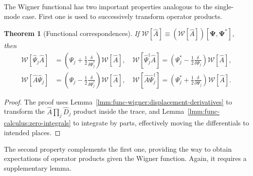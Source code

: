 \documentclass[12pt,aip,jmp,amssymb,amsmath]{revtex4-1}
\newtheorem{theorem}{Theorem}
\begin{document}
The Wigner functional has two important properties analogous to the single-mode case.
First one is used to successively transform operator products.

\begin{theorem}[Functional correspondences]
\label{thm:func-wigner:correspondences}
    If $\mathcal{W} [ \hat{A} ] \equiv (\mathcal{W} [ \hat{A} ]) [\boldsymbol{\Psi}, \boldsymbol{\Psi}^*]$, then
    \begin{equation*}\begin{split}
        \mathcal{W} [ \hat{\Psi}_j \hat{A} ]
            & = \left( \Psi_j + \frac{1}{2} \frac{\delta}{\delta \Psi_j^*} \right) \mathcal{W}[\hat{A}],
        \quad
        \mathcal{W} [ \hat{\Psi}_j^\dagger \hat{A} ]
            = \left( \Psi_j^* - \frac{1}{2} \frac{\delta}{\delta \Psi_j} \right) \mathcal{W}[\hat{A}], \\
        \mathcal{W} [ \hat{A} \hat{\Psi}_j ]
            & = \left( \Psi_j - \frac{1}{2} \frac{\delta}{\delta \Psi_j^*} \right) \mathcal{W}[\hat{A}],
        \quad
        \mathcal{W} [ \hat{A} \hat{\Psi}_j^\dagger ]
            = \left( \Psi_j^* + \frac{1}{2} \frac{\delta}{\partial \Psi_j} \right) \mathcal{W}[\hat{A}].
    \end{split}\end{equation*}
\end{theorem}
\begin{proof}
The proof uses Lemma~\ref{lmm:func-wigner:displacement-derivatives} to transform the $\hat{A} \prod_j \hat{D}_j$ product inside the trace, and Lemma~\ref{lmm:func-calculus:zero-integrals} to integrate by parts, effectively moving the differentials to intended places.
\end{proof}

The second property complements the first one, providing the way to obtain expectations of operator products given the Wigner function.
Again, it requires a supplementary lemma.
\end{document}
